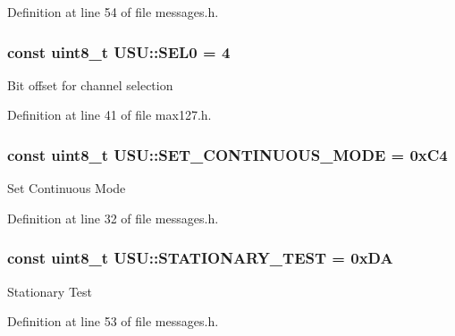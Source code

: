 \-Definition at line 54 of file messages.\-h.

\hypertarget{namespace_u_s_u_af74f2b5c887719077addc33c5986024b}{
\subsubsection[{\-S\-E\-L0}]{\setlength{\rightskip}{0pt plus 5cm}const uint8\-\_\-t {\bf \-U\-S\-U\-::\-S\-E\-L0} = 4}}\label{namespace_u_s_u_af74f2b5c887719077addc33c5986024b}
\-Bit offset for channel selection 

\-Definition at line 41 of file max127.\-h.

\hypertarget{namespace_u_s_u_a1f3d4b142078bc61d7dea5676b399d29}{
\subsubsection[{\-S\-E\-T\-\_\-\-C\-O\-N\-T\-I\-N\-U\-O\-U\-S\-\_\-\-M\-O\-D\-E}]{\setlength{\rightskip}{0pt plus 5cm}const uint8\-\_\-t {\bf \-U\-S\-U\-::\-S\-E\-T\-\_\-\-C\-O\-N\-T\-I\-N\-U\-O\-U\-S\-\_\-\-M\-O\-D\-E} = 0x\-C4}}\label{namespace_u_s_u_a1f3d4b142078bc61d7dea5676b399d29}
\-Set \-Continuous \-Mode 

\-Definition at line 32 of file messages.\-h.

\hypertarget{namespace_u_s_u_aa13337d52a46707f63911e7c2972971b}{
\subsubsection[{\-S\-T\-A\-T\-I\-O\-N\-A\-R\-Y\-\_\-\-T\-E\-S\-T}]{\setlength{\rightskip}{0pt plus 5cm}const uint8\-\_\-t {\bf \-U\-S\-U\-::\-S\-T\-A\-T\-I\-O\-N\-A\-R\-Y\-\_\-\-T\-E\-S\-T} = 0x\-D\-A}}\label{namespace_u_s_u_aa13337d52a46707f63911e7c2972971b}
\-Stationary \-Test 

\-Definition at line 53 of file messages.\-h.

